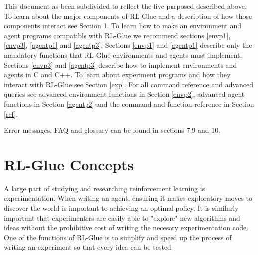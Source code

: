 \documentclass[11pt]{article}
\begin{document}
This document as been subdivided to reflect the five purposed described above. To learn about the major components of RL-Glue and a description of how those components interact see Section \ref{RL-Glue}. To learn how to make an environment and agent programs compatible with RL-Glue we recommend sections \ref{envp1}, \ref{envp3}, \ref{agentp1} and \ref{agentp3}. Sections \ref{envp1} and \ref{agentp1} describe only the mandatory functions that RL-Glue environments and agents must implement. Sections \ref{envp3} and \ref{agentp3} describe how to implement environments and agents in C and C++. To learn about experiment programs and how they interact with RL-Glue see Section \ref{exp}. For all command reference and advanced queries see advanced environment functions in Section \ref{envp2}, advanced agent functions in Section \ref{agentp2} and the command and function reference in Section \ref{ref}.

Error messages, FAQ and glossary can be found in sections 7,9 and 10.



 
 
\section{RL-Glue Concepts}
\label{RL-Glue}
A large part of studying and researching reinforcement learning is experimentation. When writing an agent, ensuring it makes exploratory moves to discover the world is important to achieving an optimal policy. It is similarly important that experimenters are easily able to "explore" new algorithms and ideas without the prohibitive cost of writing the necesary experimentation code. One of the functions of RL-Glue is to simplify and speed up the process of writing an experiment so that every idea can be tested. 
\end{document}
